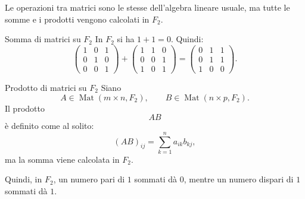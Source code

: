 \documentclass[a4paper]{article}
\begin{document}
Le operazioni tra matrici sono le stesse dell'algebra lineare usuale, ma tutte le somme e i prodotti vengono calcolati in \(F_2\).

\begin{snippetexample}{Somma di matrici su \(F_2\)}
    In \(F_2\) si ha \(1+1=0\). Quindi:
    \[
        \begin{pmatrix}
            1 & 0 & 1\\
            0 & 1 & 0\\
            0 & 0 & 1
        \end{pmatrix}
        +
        \begin{pmatrix}
            1 & 1 & 0\\
            0 & 0 & 1\\
            1 & 0 & 1
        \end{pmatrix}
        =
        \begin{pmatrix}
            0 & 1 & 1\\
            0 & 1 & 1\\
            1 & 0 & 0
        \end{pmatrix}.
    \]
\end{snippetexample}

\begin{snippetdefinition}{Prodotto di matrici su \(F_2\)}
    Siano
    \[
        A\in\operatorname{Mat}(m\times n,F_2),
        \qquad
        B\in\operatorname{Mat}(n\times p,F_2).
    \]
    Il prodotto
    \[
        AB
    \]
    è definito come al solito:
    \[
        (AB)_{ij}
        =
        \sum_{k=1}^{n}a_{ik}b_{kj},
    \]
    ma la somma viene calcolata in \(F_2\).
\end{snippetdefinition}

Quindi, in \(F_2\), un numero pari di \(1\) sommati dà \(0\), mentre un numero dispari di \(1\) sommati dà \(1\).
\end{document}
